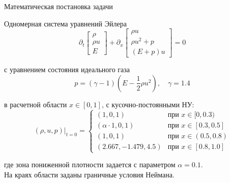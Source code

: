 \documentclass[ignoreonframetext,unicode,aspectratio=169]{beamer}
\begin{document}
	\begin{frame}{Математическая постановка задачи}
		
		\begin{block}{Одномерная система уравнений Эйлера}
			\[
			\partial_t \begin{bmatrix} \rho \\ \rho u \\ E \end{bmatrix} + 
			\partial_x \begin{bmatrix} \rho u \\ \rho u^2 + p \\ ( E + p)u \end{bmatrix} = 0
			\]
			
			с уравнением состояния идеального газа
			\vspace{-0.3 cm}
			\[
			p = (\gamma - 1)\left( E - \frac{1}{2}\rho u^2 \right), \quad \gamma = 1.4
			\]
		\end{block}
		
		в расчетной области $x \in [0, 1]$, с кусочно-постоянными НУ:
		\vspace{-0.15 cm}
		\[
		(\rho, u, p)|_{t=0} = 
		\begin{cases}
			(1, 0, 1) & \text{при } x \in [0, 0.3) \\
			(\alpha \cdot 1, 0, 1) & \text{при } x \in [0.3, 0.5] \\
			(1, 0, 1) & \text{при } x \in (0.5, 0.8) \\
			(2.667, -1.479, 4.5) & \text{при } x \in [0.8, 1.0]
		\end{cases}
		\]
		
		\vspace{-0.2 cm}
		где зона пониженной плотности задается с параметром $\alpha = 0.1$. \\
		На краях области заданы граничные условия Неймана.
	\end{frame}

		
	
\end{document}
